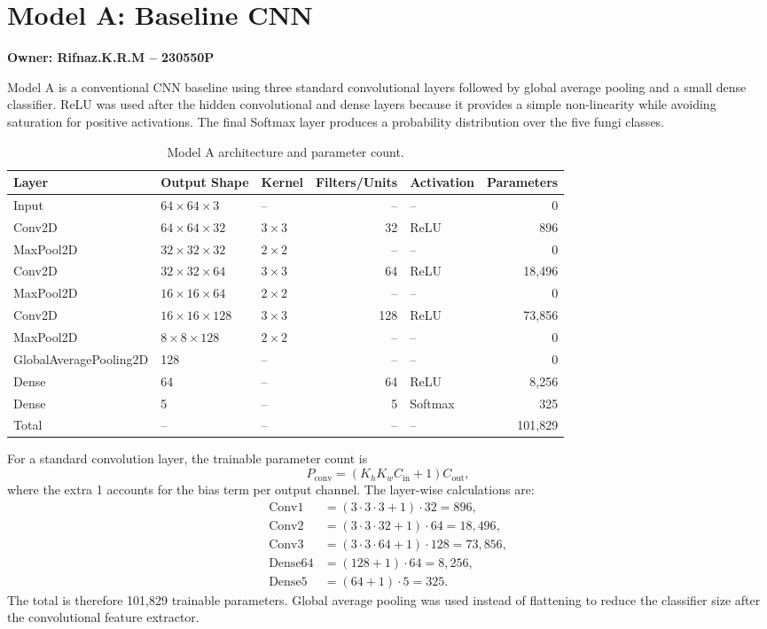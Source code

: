 \section{Model A: Baseline CNN}
\textbf{Owner: Rifnaz.K.R.M -- 230550P}

Model A is a conventional CNN baseline using three standard convolutional layers followed by global average pooling and a small dense classifier. ReLU was used after the hidden convolutional and dense layers because it provides a simple non-linearity while avoiding saturation for positive activations. The final Softmax layer produces a probability distribution over the five fungi classes.

\begin{table}[H]
\centering
\caption{Model A architecture and parameter count.}
\label{tab:model_a_arch}
\small
\begin{tabularx}{\linewidth}{l l l r l r}
\toprule
Layer & Output Shape & Kernel & Filters/Units & Activation & Parameters \\
\midrule
Input & $64\times64\times3$ & -- & -- & -- & 0 \\
Conv2D & $64\times64\times32$ & $3\times3$ & 32 & ReLU & 896 \\
MaxPool2D & $32\times32\times32$ & $2\times2$ & -- & -- & 0 \\
Conv2D & $32\times32\times64$ & $3\times3$ & 64 & ReLU & 18,496 \\
MaxPool2D & $16\times16\times64$ & $2\times2$ & -- & -- & 0 \\
Conv2D & $16\times16\times128$ & $3\times3$ & 128 & ReLU & 73,856 \\
MaxPool2D & $8\times8\times128$ & $2\times2$ & -- & -- & 0 \\
GlobalAveragePooling2D & 128 & -- & -- & -- & 0 \\
Dense & 64 & -- & 64 & ReLU & 8,256 \\
Dense & 5 & -- & 5 & Softmax & 325 \\
\midrule
Total & -- & -- & -- & -- & 101,829 \\
\bottomrule
\end{tabularx}
\end{table}

For a standard convolution layer, the trainable parameter count is
\begin{equation}
P_{\mathrm{conv}} = (K_hK_wC_{\mathrm{in}} + 1)C_{\mathrm{out}},
\end{equation}
where the extra 1 accounts for the bias term per output channel. The layer-wise calculations are:
\begin{align}
\mathrm{Conv1} &= (3\cdot3\cdot3 + 1)\cdot32 = 896,\\
\mathrm{Conv2} &= (3\cdot3\cdot32 + 1)\cdot64 = 18,496,\\
\mathrm{Conv3} &= (3\cdot3\cdot64 + 1)\cdot128 = 73,856,\\
\mathrm{Dense64} &= (128 + 1)\cdot64 = 8,256,\\
\mathrm{Dense5} &= (64 + 1)\cdot5 = 325.
\end{align}
The total is therefore 101,829 trainable parameters. Global average pooling was used instead of flattening to reduce the classifier size after the convolutional feature extractor.
